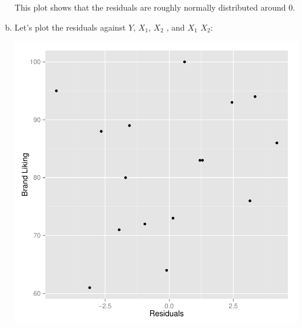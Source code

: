 \documentclass{article}
\begin{document}
\begin{enumerate}[a)]
This plot shows that the residuals are roughly normally distributed around 0.

\item{} Let's plot the residuals against $Y$, $X_1$, $X_2$ , and $X_1$ $X_2$:
 
\begin{Schunk}
\end{Schunk}
\includegraphics{Fig-moreplots}


\end{enumerate}
\end{document}
